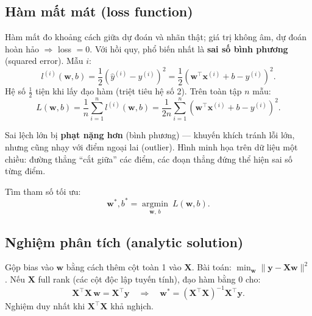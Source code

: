 \documentclass[12pt,a4paper]{article}
\begin{document}
\subsection{Hàm mất mát (loss function)}

\begin{dinhnghia}[title={Sai số bình phương}]
Hàm mất đo khoảng cách giữa dự đoán và nhãn thật; giá trị không âm, dự đoán hoàn hảo $\Rightarrow$ loss $= 0$. Với hồi quy, phổ biến nhất là \textbf{sai số bình phương} (squared error). Mẫu $i$:
\begin{equation}\label{eq:loss-i}
  l^{(i)}(\mathbf{w}, b) = \frac{1}{2}\left(\hat{y}^{(i)} - y^{(i)}\right)^2
  = \frac{1}{2}\left(\mathbf{w}^\top \mathbf{x}^{(i)} + b - y^{(i)}\right)^2.
\end{equation}
Hệ số $\frac{1}{2}$ tiện khi lấy đạo hàm (triệt tiêu hệ số 2). Trên toàn tập $n$ mẫu:
\begin{equation}\label{eq:loss-total}
  L(\mathbf{w}, b) = \frac{1}{n}\sum_{i=1}^n l^{(i)}(\mathbf{w}, b)
  = \frac{1}{2n}\sum_{i=1}^n \left(\mathbf{w}^\top \mathbf{x}^{(i)} + b - y^{(i)}\right)^2.
\end{equation}
\end{dinhnghia}

\begin{ynghia}[title={Tính bậc hai của loss}]
Sai lệch lớn bị \textbf{phạt nặng hơn} (bình phương) --- khuyến khích tránh lỗi lớn, nhưng cũng nhạy với điểm ngoại lai (outlier). Hình minh họa trên dữ liệu một chiều: đường thẳng ``cắt giữa'' các điểm, các đoạn thẳng đứng thể hiện sai số từng điểm.
\end{ynghia}

\begin{congthuc}[title={Bài toán tối ưu}]
Tìm tham số tối ưu:
\begin{equation}\label{eq:argmin}
  \mathbf{w}^*, b^* = \operatorname*{argmin}_{\mathbf{w},\, b}\ L(\mathbf{w}, b).
\end{equation}
\end{congthuc}

\subsection{Nghiệm phân tích (analytic solution)}

\begin{dinhly}[title={Công thức bình phương tối thiểu (normal equation)}]
Gộp bias vào $\mathbf{w}$ bằng cách thêm cột toàn 1 vào $\mathbf{X}$. Bài toán: $\min_{\mathbf{w}} \|\mathbf{y} - \mathbf{X}\mathbf{w}\|^2$. Nếu $\mathbf{X}$ full rank (các cột độc lập tuyến tính), đạo hàm bằng 0 cho:
\begin{equation}\label{eq:normal}
  \mathbf{X}^\top \mathbf{X}\,\mathbf{w} = \mathbf{X}^\top \mathbf{y}
  \quad\Rightarrow\quad
  \mathbf{w}^* = (\mathbf{X}^\top \mathbf{X})^{-1}\mathbf{X}^\top \mathbf{y}.
\end{equation}
Nghiệm duy nhất khi $\mathbf{X}^\top\mathbf{X}$ khả nghịch.
\end{dinhly}
\end{document}
